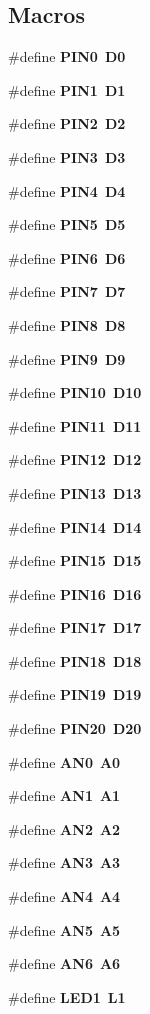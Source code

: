 \subsection*{Macros}
\begin{DoxyCompactItemize}
\item 
\#define {\bf P\-I\-N0}~{\bf D0}
\item 
\#define {\bf P\-I\-N1}~{\bf D1}
\item 
\#define {\bf P\-I\-N2}~{\bf D2}
\item 
\#define {\bf P\-I\-N3}~{\bf D3}
\item 
\#define {\bf P\-I\-N4}~{\bf D4}
\item 
\#define {\bf P\-I\-N5}~{\bf D5}
\item 
\#define {\bf P\-I\-N6}~{\bf D6}
\item 
\#define {\bf P\-I\-N7}~{\bf D7}
\item 
\#define {\bf P\-I\-N8}~{\bf D8}
\item 
\#define {\bf P\-I\-N9}~{\bf D9}
\item 
\#define {\bf P\-I\-N10}~{\bf D10}
\item 
\#define {\bf P\-I\-N11}~{\bf D11}
\item 
\#define {\bf P\-I\-N12}~{\bf D12}
\item 
\#define {\bf P\-I\-N13}~{\bf D13}
\item 
\#define {\bf P\-I\-N14}~{\bf D14}
\item 
\#define {\bf P\-I\-N15}~{\bf D15}
\item 
\#define {\bf P\-I\-N16}~{\bf D16}
\item 
\#define {\bf P\-I\-N17}~{\bf D17}
\item 
\#define {\bf P\-I\-N18}~{\bf D18}
\item 
\#define {\bf P\-I\-N19}~{\bf D19}
\item 
\#define {\bf P\-I\-N20}~{\bf D20}
\item 
\#define {\bf A\-N0}~{\bf A0}
\item 
\#define {\bf A\-N1}~{\bf A1}
\item 
\#define {\bf A\-N2}~{\bf A2}
\item 
\#define {\bf A\-N3}~{\bf A3}
\item 
\#define {\bf A\-N4}~{\bf A4}
\item 
\#define {\bf A\-N5}~{\bf A5}
\item 
\#define {\bf A\-N6}~{\bf A6}
\item 
\#define {\bf L\-E\-D1}~{\bf L1}
\item 

\end{DoxyCompactItemize}

